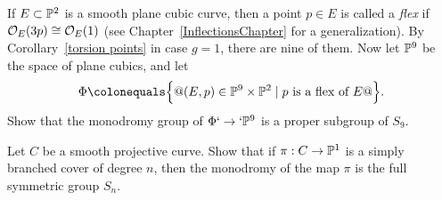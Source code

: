 \begin{exercise}
If $E \subset \PP^2$ is a smooth plane cubic curve, then a point $p \in E$
is called a
\textit{flex}
%
if $\cO_E(3p) \cong \cO_E(1)$ (see Chapter~\ref{InflectionsChapter} for a generalization). By Corollary~\ref{torsion
points} in case $g=1$, there are nine of them. Now let $\PP^9$ be the
space of
plane cubics,
%
and let
$$
\Phi \colonequals  \big\{@(E, p) \in \PP^9 \times \PP^2 \mid p \text{ is a
flex of } E@ \big \}.
$$
Show that the monodromy group of $\Phi` \to `\PP^9$ is a proper subgroup
of $S_9$.\kern-0.5pt
\end{exercise}

\begin{exercise}
Let $C$ be a smooth projective curve. Show that if $\pi : C \to \PP^1$
is a simply branched cover of degree $n$, then the monodromy of the map
$\pi$ is the full symmetric group $S_n$.
%
\end{exercise}

